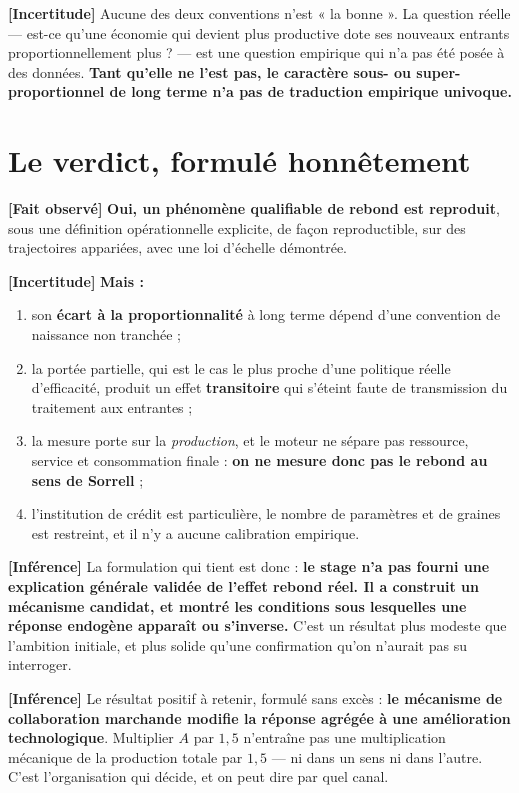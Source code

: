 \documentclass[11pt,a4paper]{article}
\newcommand{\fait}{\textbf{[Fait observé]}}
\newcommand{\inference}{\textbf{[Inférence]}}
\newcommand{\incertitude}{\textbf{[Incertitude]}}
\begin{document}
\incertitude{} Aucune des deux conventions n'est « la bonne ». La question
réelle --- est-ce qu'une économie qui devient plus productive dote ses
nouveaux entrants proportionnellement plus ? --- est une question empirique
qui n'a pas été posée à des données. \textbf{Tant qu'elle ne l'est pas, le
caractère sous- ou super-proportionnel de long terme n'a pas de traduction
empirique univoque.}

\section{Le verdict, formulé honnêtement}

\fait{} \textbf{Oui, un phénomène qualifiable de rebond est reproduit},
sous une définition opérationnelle explicite, de façon reproductible, sur des
trajectoires appariées, avec une loi d'échelle démontrée.

\incertitude{} \textbf{Mais :}

\begin{enumerate}
\item son \textbf{écart à la proportionnalité} à long terme dépend d'une convention de naissance non
      tranchée ;
\item la portée partielle, qui est le cas le plus proche d'une politique réelle
      d'efficacité, produit un effet \textbf{transitoire} qui s'éteint faute de
      transmission du traitement aux entrantes ;
\item la mesure porte sur la \emph{production}, et le moteur ne sépare pas
      ressource, service et consommation finale : \textbf{on ne mesure donc pas
      le rebond au sens de Sorrell} ;
\item l'institution de crédit est particulière, le nombre de paramètres et de
      graines est restreint, et il n'y a aucune calibration empirique.
\end{enumerate}

\inference{} La formulation qui tient est donc : \textbf{le stage n'a pas fourni
une explication générale validée de l'effet rebond réel. Il a construit un
mécanisme candidat, et montré les conditions sous lesquelles une réponse
endogène apparaît ou s'inverse.} C'est un résultat plus modeste que
l'ambition initiale, et plus solide qu'une confirmation qu'on n'aurait pas
su interroger.

\inference{} Le résultat positif à retenir, formulé sans excès : \textbf{le
mécanisme de collaboration marchande modifie la réponse agrégée à une
amélioration technologique}. Multiplier $A$ par $1{,}5$ n'entraîne pas une
multiplication mécanique de la production totale par $1{,}5$ --- ni dans un
sens ni dans l'autre. C'est l'organisation qui décide, et on peut dire par quel
canal.
\end{document}
